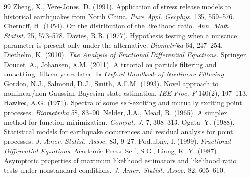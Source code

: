 \documentclass[10pt,a4paper]{article}
\begin{document}
\begin{thebibliography}{99}
 Zheng, X., Vere-Jones, D. (1991). Application of stress release models to historical earthquakes from North China. \emph{Pure Appl. Geophys.} 135, 559--576.
 Chernoff, H. (1954). On the distribution of the likelihood ratio. \emph{Ann. Math. Statist.} 25, 573--578.
 Davies, R.B. (1977). Hypothesis testing when a nuisance parameter is present only under the alternative. \emph{Biometrika} 64, 247--254.
 Diethelm, K. (2010). \emph{The Analysis of Fractional Differential Equations}. Springer.
 Doucet, A., Johansen, A.M. (2011). A tutorial on particle filtering and smoothing: fifteen years later. In \emph{Oxford Handbook of Nonlinear Filtering}.
 Gordon, N.J., Salmond, D.J., Smith, A.F.M. (1993). Novel approach to nonlinear/non-Gaussian Bayesian state estimation. \emph{IEE Proc. F} 140(2), 107--113.
 Hawkes, A.G. (1971). Spectra of some self-exciting and mutually exciting point processes. \emph{Biometrika} 58, 83--90.
 Nelder, J.A., Mead, R. (1965). A simplex method for function minimization. \emph{Comput. J.} 7, 308--313.
 Ogata, Y. (1988). Statistical models for earthquake occurrences and residual analysis for point processes. \emph{J. Amer. Statist. Assoc.} 83, 9--27.
 Podlubny, I. (1999). \emph{Fractional Differential Equations}. Academic Press.
 Self, S.G., Liang, K.-Y. (1987). Asymptotic properties of maximum likelihood estimators and likelihood ratio tests under nonstandard conditions. \emph{J. Amer. Statist. Assoc.} 82, 605--610.
\end{thebibliography}
\end{document}
